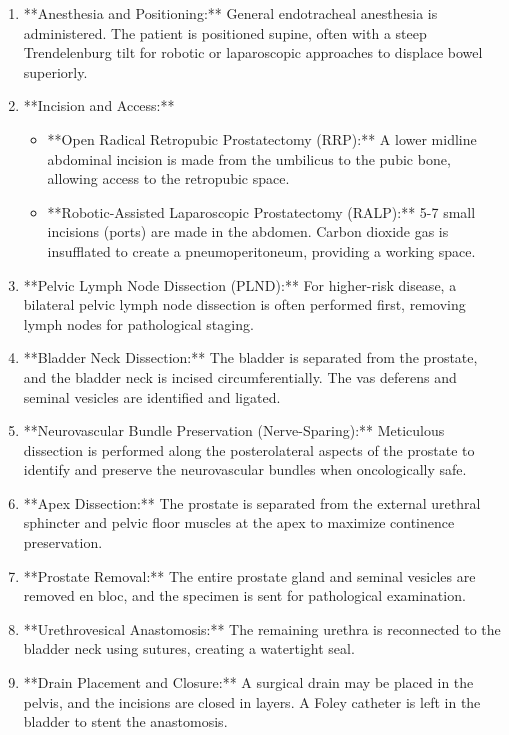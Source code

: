 \begin{enumerate}
  \item **Anesthesia and Positioning:** General endotracheal anesthesia is administered. The patient is positioned supine, often with a steep Trendelenburg tilt for robotic or laparoscopic approaches to displace bowel superiorly.
  
  \item **Incision and Access:**
      \begin{itemize}
        \item **Open Radical Retropubic Prostatectomy (RRP):** A lower midline abdominal incision is made from the umbilicus to the pubic bone, allowing access to the retropubic space.
        \item **Robotic-Assisted Laparoscopic Prostatectomy (RALP):** 5-7 small incisions (ports) are made in the abdomen. Carbon dioxide gas is insufflated to create a pneumoperitoneum, providing a working space.
      \end{itemize}
  
  \item **Pelvic Lymph Node Dissection (PLND):** For higher-risk disease, a bilateral pelvic lymph node dissection is often performed first, removing lymph nodes for pathological staging.
  
  \item **Bladder Neck Dissection:** The bladder is separated from the prostate, and the bladder neck is incised circumferentially. The vas deferens and seminal vesicles are identified and ligated.
  
  \item **Neurovascular Bundle Preservation (Nerve-Sparing):** Meticulous dissection is performed along the posterolateral aspects of the prostate to identify and preserve the neurovascular bundles when oncologically safe.
  
  \item **Apex Dissection:** The prostate is separated from the external urethral sphincter and pelvic floor muscles at the apex to maximize continence preservation.
  
  \item **Prostate Removal:** The entire prostate gland and seminal vesicles are removed en bloc, and the specimen is sent for pathological examination.
  
  \item **Urethrovesical Anastomosis:** The remaining urethra is reconnected to the bladder neck using sutures, creating a watertight seal.
  
  \item **Drain Placement and Closure:** A surgical drain may be placed in the pelvis, and the incisions are closed in layers. A Foley catheter is left in the bladder to stent the anastomosis.
\end{enumerate}

